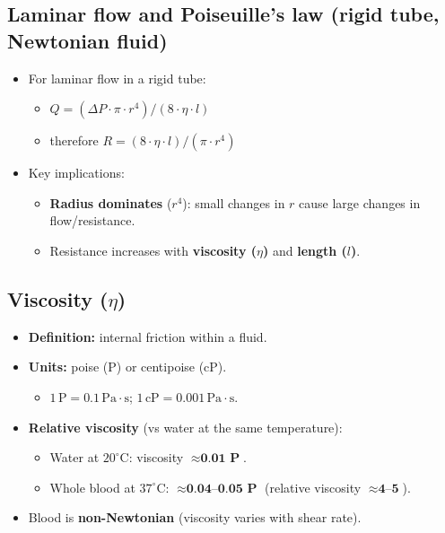 \documentclass[11pt,a4paper]{article}
\begin{document}
\subsection{Laminar flow and Poiseuille’s law (rigid tube, Newtonian fluid)}
\begin{itemize}
\item For laminar flow in a rigid tube:
  \begin{itemize}
  \item \textbf{$Q=(\Delta P \cdot \pi \cdot r^4)/(8\cdot \eta \cdot l)$}
  \item therefore \textbf{$R=(8\cdot \eta \cdot l)/(\pi \cdot r^4)$}
  \end{itemize}
\item Key implications:
  \begin{itemize}
  \item \textbf{Radius dominates} ($r^4$): small changes in $r$ cause large changes in flow/resistance.
  \item Resistance increases with \textbf{viscosity ($\eta$)} and \textbf{length ($l$)}.
  \end{itemize}
\end{itemize}

\subsection{Viscosity ($\eta$)}
\begin{itemize}
\item \textbf{Definition:} internal friction within a fluid.
\item \textbf{Units:} poise (P) or centipoise (cP).
  \begin{itemize}
  \item $1\,\mathrm{P}=0.1\,\mathrm{Pa\cdot s}$; $1\,\mathrm{cP}=0.001\,\mathrm{Pa\cdot s}$.
  \end{itemize}
\item \textbf{Relative viscosity} (vs water at the same temperature):
  \begin{itemize}
  \item Water at $20^{\circ}\mathrm{C}$: viscosity $\approx \textbf{0.01 P}$.
  \item Whole blood at $37^{\circ}\mathrm{C}$: $\approx \textbf{0.04--0.05 P}$ (relative viscosity $\approx \textbf{4--5}$).
  \end{itemize}
\item Blood is \textbf{non-Newtonian} (viscosity varies with shear rate).
\end{itemize}
\end{document}
